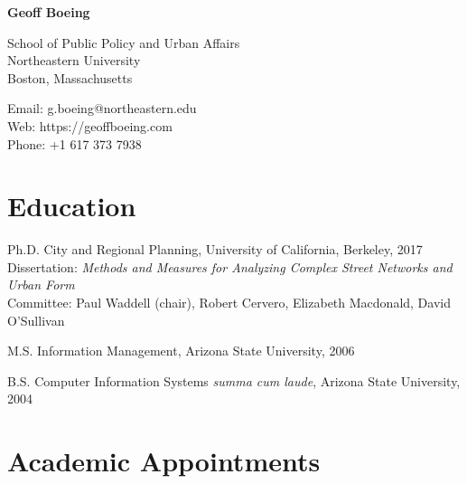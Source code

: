 \documentclass[12pt,letterpaper]{report}
\newcommand{\myname}{Geoff Boeing}
\newcommand{\namefont}[1]{{\normalfont\bfseries\Huge{#1}}}
\begin{document}
	\raggedright
	
	\namefont{\myname}
	
	\vspace{1em}
	\begin{minipage}[t]{0.495\textwidth}
		School of Public Policy and Urban Affairs \\
		Northeastern University \\
		Boston, Massachusetts
	\end{minipage}
	\begin{minipage}[t]{0.495\textwidth}
		Email: g.boeing@northeastern.edu \\
		Web: https://geoffboeing.com \\
		Phone: +1 617 373 7938
	\end{minipage}
	\vspace{0.5em}
	
	
	
	\section*{Education}
	
	\begin{tablist}
		
		\item[Ph.D.] \tab City and Regional Planning, University of California, Berkeley, 2017 \\
		Dissertation: \textit{Methods and Measures for Analyzing Complex Street Networks and Urban Form} \\
		Committee: Paul Waddell (chair), Robert Cervero, Elizabeth Macdonald, David O'Sullivan
		
		\item[M.S.]  \tab Information Management, Arizona State University, 2006
		
		\item[B.S.]  \tab Computer Information Systems \textit{summa cum laude}, Arizona State University, 2004
		
	\end{tablist}
	
	
	
	\section*{Academic Appointments}
	
\end{document}
